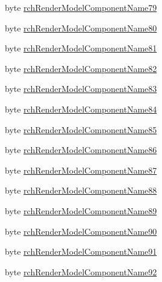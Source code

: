 \begin{DoxyCompactItemize}
\item 
byte \mbox{\hyperlink{struct_valve_1_1_v_r_1_1_input_origin_info__t_a9809971c0cfde4a8e343c808aa366647}{rch\+Render\+Model\+Component\+Name79}}
\item 
byte \mbox{\hyperlink{struct_valve_1_1_v_r_1_1_input_origin_info__t_ae36d0ccd8d165bc19dc64ee0305f1ec5}{rch\+Render\+Model\+Component\+Name80}}
\item 
byte \mbox{\hyperlink{struct_valve_1_1_v_r_1_1_input_origin_info__t_a508620f1745fb543bd34fb0abfd4a49b}{rch\+Render\+Model\+Component\+Name81}}
\item 
byte \mbox{\hyperlink{struct_valve_1_1_v_r_1_1_input_origin_info__t_a83308543c2cdec25e3ca10bbd0d6c14c}{rch\+Render\+Model\+Component\+Name82}}
\item 
byte \mbox{\hyperlink{struct_valve_1_1_v_r_1_1_input_origin_info__t_a45d6d67f423f4ac97ee30037c85b0b9f}{rch\+Render\+Model\+Component\+Name83}}
\item 
byte \mbox{\hyperlink{struct_valve_1_1_v_r_1_1_input_origin_info__t_ade8c8327dd1f707ef31de46219db9177}{rch\+Render\+Model\+Component\+Name84}}
\item 
byte \mbox{\hyperlink{struct_valve_1_1_v_r_1_1_input_origin_info__t_ab1f80c1c379601394e74489d3e1b8513}{rch\+Render\+Model\+Component\+Name85}}
\item 
byte \mbox{\hyperlink{struct_valve_1_1_v_r_1_1_input_origin_info__t_a724b67163542ac9e1063a7bc8c178531}{rch\+Render\+Model\+Component\+Name86}}
\item 
byte \mbox{\hyperlink{struct_valve_1_1_v_r_1_1_input_origin_info__t_acc269e2ac9147c4eab713347d28714ee}{rch\+Render\+Model\+Component\+Name87}}
\item 
byte \mbox{\hyperlink{struct_valve_1_1_v_r_1_1_input_origin_info__t_a9c1dc13d8bf543a8e686f723ece16d9b}{rch\+Render\+Model\+Component\+Name88}}
\item 
byte \mbox{\hyperlink{struct_valve_1_1_v_r_1_1_input_origin_info__t_a92fe2fe83db952fd54dec483ef1b93cd}{rch\+Render\+Model\+Component\+Name89}}
\item 
byte \mbox{\hyperlink{struct_valve_1_1_v_r_1_1_input_origin_info__t_af2428d3f819d98cabbdc330869586002}{rch\+Render\+Model\+Component\+Name90}}
\item 
byte \mbox{\hyperlink{struct_valve_1_1_v_r_1_1_input_origin_info__t_a8b430846ee20e30d55eb52cdf92e9bd0}{rch\+Render\+Model\+Component\+Name91}}
\item 
byte \mbox{\hyperlink{struct_valve_1_1_v_r_1_1_input_origin_info__t_a437b3a0c4b3413bdd7e88ae70567f135}{rch\+Render\+Model\+Component\+Name92}}

\end{DoxyCompactItemize}
